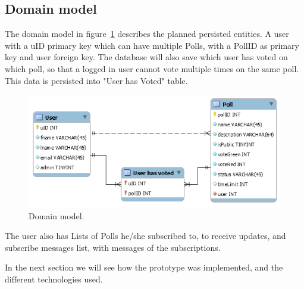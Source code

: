 \subsection{Domain model}
\label{sub:domainmodel}
The domain model in figure~\ref{fig:domainmodel} describes the planned persisted entities. A user with a uID primary key which can have multiple Polls, with a PollID as primary key and user foreign key. The database will also save which user has voted on which poll, so that a logged in user cannot vote multiple times on the same poll. This data is persisted into "User has Voted" table.
\begin{figure}[H]
  \centering
  \includegraphics[scale=0.45]{figs/domainmodel.png}
  \caption[scale=0.5]{Domain model.}
  \label{fig:domainmodel}
\end{figure}

The user also has Lists of Polls he/she subscribed to, to receive updates, and subscribe messages list, with messages of the subscriptions.

\par\noindent In the next section we will see how the prototype was implemented, and the different technologies used.